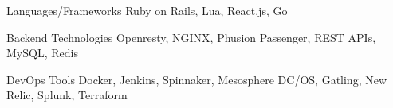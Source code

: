 

\begin{cvskills}

  \cvskill
    {Languages/Frameworks} %
    {Ruby on Rails, Lua, React.js, Go} %


  \cvskill
    {Backend Technologies} %
    {Openresty, NGINX, Phusion Passenger, REST APIs, MySQL, Redis} %

  \cvskill
    {DevOps Tools} %
    {Docker, Jenkins, Spinnaker, Mesosphere DC/OS, Gatling, New Relic, Splunk, Terraform} %

\end{cvskills}
